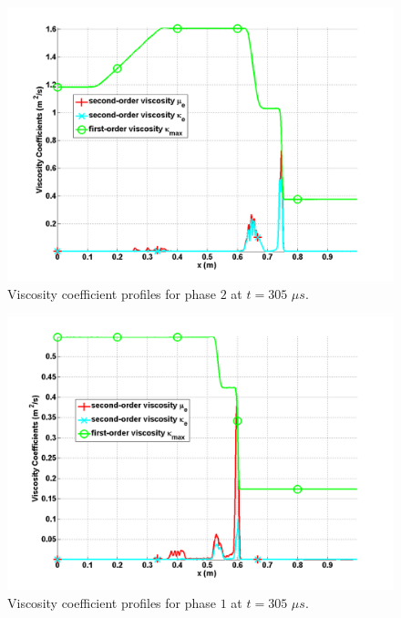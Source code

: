 \begin{figure}[H]
\centering
\includegraphics[width=\textwidth]{figures/SEM/two_phases_liquid_viscosity_kappa_mu.png}
\caption{Viscosity coefficient profiles for phase $2$ at $t=305$ $\mu s$.}
\label{fig:two-indep-fluids-visc-2-7-eqn-sect4}
\end{figure}
%
\begin{figure}[H]
\centering
\includegraphics[width=\textwidth]{figures/SEM/two_phases_vapor_viscosity_kappa_mu.png}
\caption{Viscosity coefficient profiles for phase $1$ at $t=305$ $\mu s$.}
\label{fig:two-indep-fluids-visc-1-7-eqn-sect4}
\end{figure}
%
